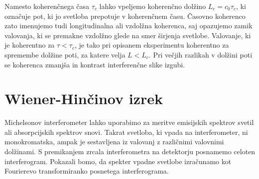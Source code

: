 Namesto koherenčnega časa $\tau_c$ lahko vpeljemo koherenčno dolžino 
$L_c = c_0 \tau_c$, ki označuje pot, ki jo svetloba prepotuje 
v koherenčnem času. Časovno koherenco zato imenujemo tudi 
longitudinalna ali vzdolžna koherenca, saj opazujemo zamik valovanja, ki se
premakne vzdolžno glede na smer širjenja svetlobe. Valovanje, ki je 
koherentno za $\tau < \tau_c$, je tako pri opisanem eksperimentu 
koherentno za spremembe dolžine poti, za katere velja $L < L_c$. Pri 
večjih razlikah v dolžini poti se koherenca zmanjša in kontrast
interferenčne slike izgubi. 

\section{Wiener-Hinčinov izrek}
Michelsonov interferometer lahko uporabimo za meritve emisijskih spektrov svetil
ali absorpcijskih spektrov snovi. Takrat svetloba, ki vpada na interferometer,
ni monokromatska, ampak je sestavljena iz valovanj z različnimi valovnimi dolžinami.
S premikanjem zrcala interferometra na detektorju posnamemo celoten interferogram. Pokazali bomo, da
spekter vpadne svetlobe izračunamo kot Fourierevo transformiranko posnetega interferograma. 

